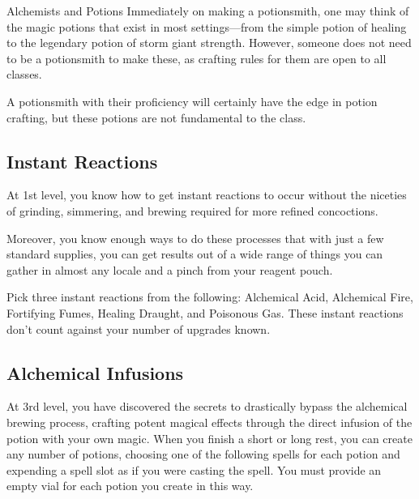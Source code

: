 \documentclass[11pt,twoside,openany]{book}  %
\begin{document}
\newpage
\twocolumn
\begin{CalloutBox}{Alchemists and Potions}
Immediately on making a potionsmith, one may think of the magic potions that exist in most settings—from the simple potion of healing to the legendary potion of storm giant strength. However, someone does not need to be a potionsmith to make these, as crafting rules for them are open to all classes.

A potionsmith with their proficiency will certainly have the edge in potion crafting, but these potions are not fundamental to the class.
\end{CalloutBox}
\subsection{Instant Reactions}

At 1st level, you know how to get instant reactions to occur without the niceties of grinding, simmering, and brewing required for more refined concoctions.

Moreover, you know enough ways to do these processes that with just a few standard supplies, you can get results out of a wide range of things you can gather in almost any locale and a pinch from your reagent pouch.

Pick three instant reactions from the following: Alchemical Acid, Alchemical Fire, Fortifying Fumes, Healing Draught, and Poisonous Gas. These instant reactions don’t count against your number of upgrades known.

\subsection{Alchemical Infusions}

At 3rd level, you have discovered the secrets to drastically bypass the alchemical brewing process, crafting potent magical effects through the direct infusion of the potion with your own magic. When you finish a short or long rest, you can create any number of potions, choosing one of the following spells for each potion and expending a spell slot as if you were casting the spell. You must provide an empty vial for each potion you create in this way.
\end{document}
